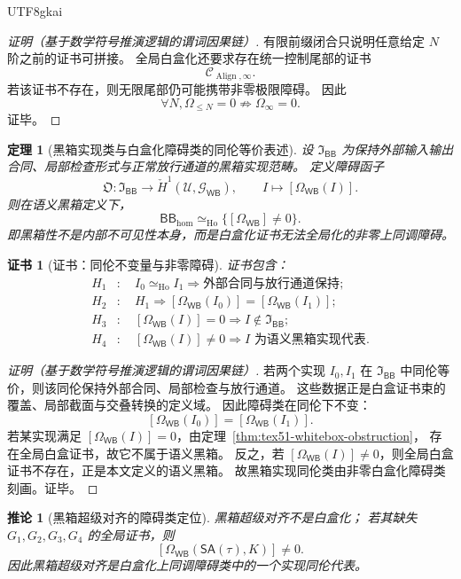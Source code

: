 \documentclass[12pt]{article}
\newtheorem{theorem}{定理}[section]
\newtheorem{corollary}{推论}[section]
\newtheorem{Certificate}{证书}[section]
\newcommand{\BB}{\mathsf{BB}}
\newcommand{\WB}{\mathsf{WB}}
\newcommand{\SA}{\mathsf{SA}}
\newcommand{\Align}{\operatorname{Align}}
\begin{document}
\begin{CJK*}{UTF8}{gkai}
\begin{proof}[证明（基于数学符号推演逻辑的谓词因果链）]
有限前缀闭合只说明任意给定 \(N\) 阶之前的证书可拼接。
全局白盒化还要求存在统一控制尾部的证书
\[
  \mathcal C_{\Align,\infty}.
\]
若该证书不存在，则无限尾部仍可能携带非零极限障碍。
因此
\[
  \forall N,\Omega_{\le N}=0
  \not\Rightarrow
  \Omega_\infty=0.
\]
证毕。
\end{proof}

\begin{theorem}[黑箱实现类与白盒化障碍类的同伦等价表述]
\label{thm:tex51-bb-homotopy-obstruction}
设 \(\mathfrak I_{\BB}\) 为保持外部输入输出合同、局部检查形式与正常放行通道的黑箱实现范畴。
定义障碍函子
\[
  \mathfrak O:\mathfrak I_{\BB}\to
  \check{H}^{1}(\mathcal U,\mathcal G_{\WB}),
  \qquad
  I\mapsto [\Omega_{\WB}(I)].
\]
则在语义黑箱定义下，
\[
  \BB_{\hom}
  \simeq_{\mathrm{Ho}}
  \bigl\{[\Omega_{\WB}]\ne 0\bigr\}.
\]
即黑箱性不是内部不可见性本身，而是白盒化证书无法全局化的非零上同调障碍。
\end{theorem}

\begin{Certificate}[证书：同伦不变量与非零障碍]
\label{cert:tex51-bb-homotopy-obstruction}
证书包含：
\[
\begin{aligned}
  H_1&:\quad I_0\simeq_{\mathrm{Ho}} I_1
  \Rightarrow \text{外部合同与放行通道保持};\\
  H_2&:\quad H_1\Rightarrow [\Omega_{\WB}(I_0)]=[\Omega_{\WB}(I_1)];\\
  H_3&:\quad [\Omega_{\WB}(I)]=0\Rightarrow I\notin\mathfrak I_{\BB};\\
  H_4&:\quad [\Omega_{\WB}(I)]\ne0\Rightarrow I\text{ 为语义黑箱实现代表}.
\end{aligned}
\]
\end{Certificate}

\begin{proof}[证明（基于数学符号推演逻辑的谓词因果链）]
若两个实现 \(I_0,I_1\) 在 \(\mathfrak I_{\BB}\) 中同伦等价，则该同伦保持外部合同、局部检查与放行通道。
这些数据正是白盒证书束的覆盖、局部截面与交叠转换的定义域。
因此障碍类在同伦下不变：
\[
  [\Omega_{\WB}(I_0)]=[\Omega_{\WB}(I_1)].
\]
若某实现满足 \([\Omega_{\WB}(I)]=0\)，由定理~\ref{thm:tex51-whitebox-obstruction}，
存在全局白盒证书，故它不属于语义黑箱。
反之，若 \([\Omega_{\WB}(I)]\ne0\)，则全局白盒证书不存在，正是本文定义的语义黑箱。
故黑箱实现同伦类由非零白盒化障碍类刻画。证毕。
\end{proof}

\begin{corollary}[黑箱超级对齐的障碍类定位]
\label{cor:tex51-sa-obstruction-representative}
黑箱超级对齐不是白盒化；
若其缺失 \(G_1,G_2,G_3,G_4\) 的全局证书，则
\[
  [\Omega_{\WB}(\SA(\tau),K)]\ne0.
\]
因此黑箱超级对齐是白盒化上同调障碍类中的一个实现同伦代表。
\end{corollary}


\end{CJK*}
\end{document}
